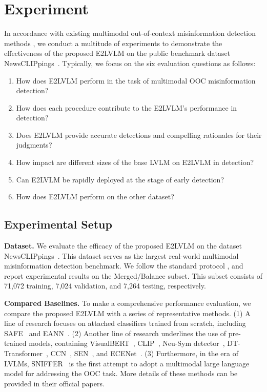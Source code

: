 \section{Experiment}
\label{sec:Experiment}

In accordance with existing multimodal out-of-context misinformation detection methods \cite{abdelnabi2022open, qi2024sniffer}, we conduct a multitude of experiments to demonstrate the effectiveness of the proposed E2LVLM on the public benchmark dataset NewsCLIPpings~\cite{luo2021newsclippings}. Typically, we focus on the six evaluation questions as follows:
\begin{enumerate}[label=\textbf{Q\arabic*:}]
    \item  How does E2LVLM perform in the task of multimodal OOC misinformation detection?
    \item  How does each procedure contribute to the E2LVLM's performance in detection?
    \item  Does E2LVLM provide accurate detections and compelling rationales for their judgments?
    \item  How impact are different sizes of the base LVLM on E2LVLM in detection?
    \item  Can E2LVLM be rapidly deployed at the stage of early detection?
    \item  How does E2LVLM perform on the other dataset?
\end{enumerate}

\subsection{Experimental Setup}

\textbf{Dataset.} We evaluate the efficacy of the proposed E2LVLM on the dataset NewsCLIPpings~\cite{luo2021newsclippings}. This dataset serves as the largest real-world multimodal misinformation detection benchmark. We follow the standard protocol \cite{abdelnabi2022open, yuan2023support, qi2024sniffer}, and report experimental results on the Merged/Balance subset. This subset consists of 71,072 training, 7,024 validation, and 7,264 testing, respectively.

\noindent \textbf{Compared Baselines.} To make a comprehensive performance evaluation, we compare the proposed E2LVLM with a series of representative methods. (1) A line of research focuses on attached classifiers trained from scratch, including SAFE~\cite{massarelli2019safe} and EANN~\cite{wang2018eann}. (2) Another line of research underlines the use of pre-trained models, containing VisualBERT~\cite{li2019visualbert}, CLIP~\cite{radford2021learning}, Neu-Sym detector~\cite{zhang2023detecting}, DT-Transformer~\cite{papadopoulos2023synthetic}, CCN~\cite{abdelnabi2022open}, SEN~\cite{yuan2023support}, and ECENet~\cite{zhang2023ecenet}. (3) Furthermore, in the era of LVLMs, SNIFFER~\cite{qi2024sniffer} is the first attempt to adopt a multimodal large language model for addressing the OOC task. More details of these methods can be provided in their official papers. 

